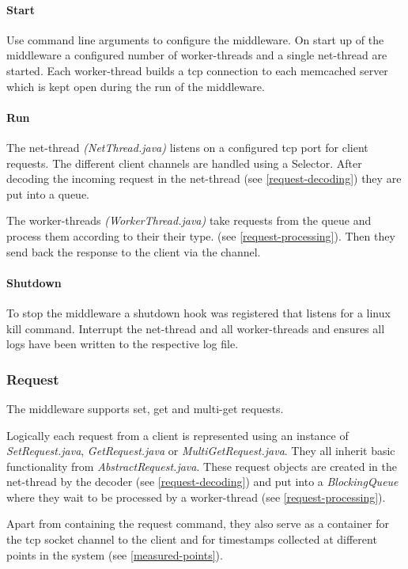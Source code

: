 \documentclass[report.tex]{subfiles}
\begin{document}
\paragraph{Start}
Use command line  arguments to configure the middleware.
On start up of the middleware a configured number of worker-threads and a single net-thread are started.
Each worker-thread builds a tcp connection to each memcached server which is kept open during the run of the middleware.

\paragraph{Run}
The net-thread \emph{(NetThread.java)} listens on a configured tcp port for client requests. The different client channels are handled using a Selector.
After decoding the incoming request in the net-thread (see \ref{request-decoding}) they are put into a queue.

The worker-threads \emph{(WorkerThread.java)} take requests from the queue and process them according to their their type. (see \ref{request-processing}). Then they send back the response to the client via the channel.


\paragraph{Shutdown}
To stop the middleware a shutdown hook was registered that listens for a linux kill command.
Interrupt the net-thread and all worker-threads and ensures all logs have been written to the respective log file.

\subsubsection{Request}
The middleware supports set, get and multi-get requests.

Logically each request from a client is represented using an instance of \emph{SetRequest.java}, \emph{GetRequest.java} or \emph{MultiGetRequest.java}. They all inherit basic functionality from \emph{AbstractRequest.java}.
These request objects are created in the net-thread by the decoder (see \ref{request-decoding}) and put into a \emph{BlockingQueue} where they wait to be processed by a worker-thread (see \ref{request-processing}).

Apart from containing the request command, they also serve as a container for the tcp socket channel to the client and for timestamps collected at different points in the system (see \ref{measured-points}).
\end{document}
